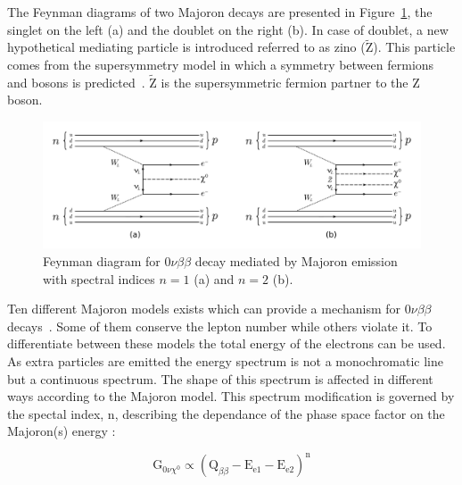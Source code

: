 \documentclass[main.tex]{subfiles}
\begin{document}


\NI The Feynman diagrams of two Majoron decays are presented in Figure~\ref{0nubbFeynmanDiagram_Majoron}, the singlet on the left (a) and the doublet on the right (b). In case of doublet, a new hypothetical mediating particle is introduced referred to as zino ($\tilde{\text{Z}}$). This particle comes from the supersymmetry model in which a symmetry between fermions and bosons is predicted~\cite{SUSYbasis}. $\tilde{\text{Z}}$ is the supersymmetric fermion partner to the Z boson.


\begin{figure}[h!]
\begin{center}
\includegraphics[scale=0.42]{pictures/Chap2/0nubbFeynmanDiagram_Majoron.pdf}
\caption{Feynman diagram for 0$\nu\beta\beta$ decay mediated by Majoron emission with spectral indices $n = 1$ (a) and $n = 2$ (b).}
\label{0nubbFeynmanDiagram_Majoron}
\end{center}
\end{figure}


\NI Ten different Majoron models exists which can provide a mechanism for 0$\nu\beta\beta$ decays~\cite{MajoronDecayMode}. Some of them conserve the lepton number while others violate it. To differentiate between these models the total energy of the electrons can be used. As extra particles are emitted the energy spectrum is not a monochromatic line but a continuous spectrum. The shape of this spectrum is affected in different ways according to the Majoron model. This spectrum modification is governed by the spectal index, n, describing the dependance of the phase space factor on the Majoron(s) energy : 


\begin{equation}
\text{G}_{\text{0}\nu\chi^\text{0}} \propto (\text{Q}_{\beta\beta} - \text{E}_{\text{e1}} - \text{E}_{\text{e2}})^\text{n}
\end{equation}
\end{document}
